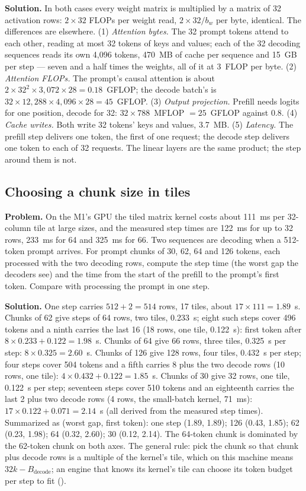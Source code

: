 \textbf{Solution.} In both cases every weight matrix is multiplied by a matrix
of 32 activation rows: $2 \times 32$ FLOPs per weight read, $2 \times 32 / b_w$
per byte, identical. The differences are elsewhere. (1) \emph{Attention bytes.}
The 32 prompt tokens attend to each other, reading at most 32 tokens of keys
and values; each of the 32 decoding sequences reads its own 4,096 tokens, 470~MB
of cache per sequence and 15~GB per step --- seven and a half times the weights, all of it
at 3~FLOP per byte. (2) \emph{Attention FLOPs.} The prompt's causal attention
is about $2 \times 32^2 \times 3{,}072 \times 28 = 0.18$~GFLOP; the decode
batch's is $32 \times 12{,}288 \times 4{,}096 \times 28 = 45$~GFLOP. (3)
\emph{Output projection.} Prefill needs logits for one position, decode for
32: $32 \times 788$~MFLOP $= 25$~GFLOP against 0.8. (4) \emph{Cache writes.}
Both write 32 tokens' keys and values, 3.7~MB. (5) \emph{Latency.} The prefill
step delivers one token, the first of one request; the decode step delivers one
token to each of 32 requests. The linear layers are the same product; the step
around them is not.

\subsection{Choosing a chunk size in tiles}
\textbf{Problem.} On the M1's GPU the tiled matrix kernel costs about 111~ms per
32-column tile at large sizes, and the measured step times are 122~ms for up to
32 rows, 233~ms for 64 and 325~ms for 66. Two sequences are decoding when a
512-token prompt arrives. For prompt chunks of 30, 62, 64 and 126 tokens,
each processed with the two decoding rows, compute the step time (the worst gap
the decoders see) and the time from the start of the prefill to the prompt's
first token. Compare with processing the prompt in one step.

\textbf{Solution.} One step carries $512 + 2 = 514$ rows, 17 tiles, about
$17 \times 111 = 1.89$~s. Chunks of 62 give steps of 64 rows, two tiles,
0.233~s; eight such steps cover 496 tokens and a ninth carries the last 16
(18 rows, one tile, 0.122~s): first token after $8 \times 0.233 + 0.122 =
1.98$~s. Chunks of 64 give 66 rows, three tiles, 0.325~s per step: $8 \times
0.325 = 2.60$~s. Chunks of 126 give 128 rows, four tiles, 0.432~s per step; four
steps cover 504 tokens and a fifth carries 8 plus the two decode rows (10 rows,
one tile): $4 \times 0.432 + 0.122 = 1.85$~s. Chunks of 30 give 32 rows, one
tile, 0.122~s per step; seventeen steps cover 510 tokens and an eighteenth
carries the last 2 plus two decode rows (4 rows, the small-batch kernel,
71~ms): $17 \times 0.122 + 0.071 = 2.14$~s (all derived from the measured step
times). Summarized as (worst gap, first token): one step (1.89, 1.89); 126
(0.43, 1.85); 62 (0.23, 1.98); 64 (0.32, 2.60); 30 (0.12, 2.14). The 64-token
chunk is dominated by the 62-token chunk on both axes. The general rule: pick
the chunk so that chunk plus decode rows is a multiple of the kernel's tile,
which on this machine means $32k - B_{\text{decode}}$; an engine that knows its
kernel's tile can choose its token budget per step to fit
().
